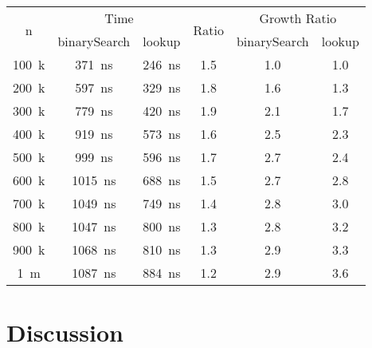 \documentclass[a4paper, 11pt]{article}
\begin{document}
    \begin{table}[h]
        \centering
        \small
\begin{tabular}{|c|c|c|c|c|c|}
\hline
\multirow{2}{*}{n} & \multicolumn{2}{c|}{Time}          & \multirow{2}{*}{Ratio}& \multicolumn{2}{c|}{Growth Ratio}\\\cline{2-3}\cline{5-6}
                   & binarySearch & lookup&                                     & binarySearch  & lookup\\
\hline
\SI{100}{k} & \SI{371}{\nano\second}  & \SI{246}{\nano\second} & \num{1.5} & \num{1.0} & \num{1.0}\\
\SI{200}{k} & \SI{597}{\nano\second}  & \SI{329}{\nano\second} & \num{1.8} & \num{1.6} & \num{1.3}\\
\SI{300}{k} & \SI{779}{\nano\second}  & \SI{420}{\nano\second} & \num{1.9} & \num{2.1} & \num{1.7}\\
\SI{400}{k} & \SI{919}{\nano\second}  & \SI{573}{\nano\second} & \num{1.6} & \num{2.5} & \num{2.3}\\
\SI{500}{k} & \SI{999}{\nano\second}  & \SI{596}{\nano\second} & \num{1.7} & \num{2.7} & \num{2.4}\\
\SI{600}{k} & \SI{1015}{\nano\second} & \SI{688}{\nano\second} & \num{1.5} & \num{2.7} & \num{2.8}\\
\SI{700}{k} & \SI{1049}{\nano\second} & \SI{749}{\nano\second} & \num{1.4} & \num{2.8} & \num{3.0}\\
\SI{800}{k} & \SI{1047}{\nano\second} & \SI{800}{\nano\second} & \num{1.3} & \num{2.8} & \num{3.2}\\
\SI{900}{k} & \SI{1068}{\nano\second} & \SI{810}{\nano\second} & \num{1.3} & \num{2.9} & \num{3.3}\\
\SI{1}{m}   & \SI{1087}{\nano\second} & \SI{884}{\nano\second} & \num{1.2} & \num{2.9} & \num{3.6}\\
\hline
\end{tabular}
    \caption{}
    \label{tab:growth}
    \end{table}
    \clearpage
    \section*{Discussion}
    \label{sec:discussion}
\end{document}
